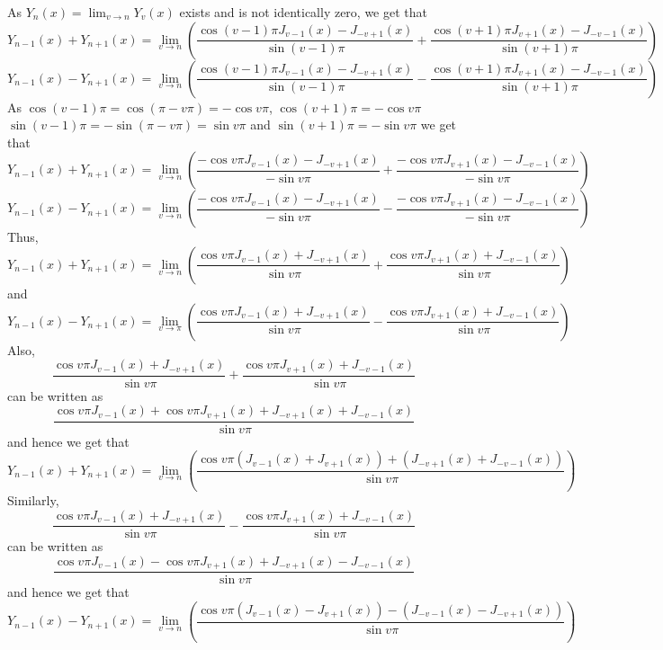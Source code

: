 \documentclass{article}
\begin{document}
\begin{flushleft}
As $Y_{n}(x)=\lim _{v \rightarrow n} Y_{v}(x)$ exists and is not identically zero, we get that 
$$Y_{n-1}(x)+Y_{n+1}(x)=\lim _{v \rightarrow n}\left(\frac{\cos (v-1) \pi J_{v-1}(x)-J_{-v+1}(x)}{\sin (v-1) \pi}+\frac{\cos (v+1) \pi J_{v+1}(x)-J_{-v-1}(x)}{\sin (v+1) \pi}\right)$$
$$Y_{n-1}(x)-Y_{n+1}(x)=\lim _{v \rightarrow n}\left(\frac{\cos (v-1) \pi J_{v-1}(x)-J_{-v+1}(x)}{\sin (v-1) \pi}-\frac{\cos (v+1) \pi J_{v+1}(x)-J_{-v-1}(x)}{\sin (v+1) \pi}\right)$$
As $\cos (v-1) \pi=\cos (\pi-v \pi)=-\cos v \pi$, $\cos (v+1) \pi=-\cos v \pi$ $\sin (v-1) \pi=-\sin (\pi-v \pi)=\sin v \pi$ and $\sin (v+1) \pi=-\sin v \pi$
we get that
$$Y_{n-1}(x)+Y_{n+1}(x)=\lim _{v \rightarrow n}\left(\frac{-\cos v \pi J_{v-1}(x)-J_{-v+1}(x)}{-\sin v \pi}+\frac{-\cos v \pi J_{v+1}(x)-J_{-v-1}(x)}{-\sin v \pi}\right)$$
$$Y_{n-1}(x)-Y_{n+1}(x)=\lim _{v \rightarrow n}\left(\frac{-\cos v \pi J_{v-1}(x)-J_{-v+1}(x)}{-\sin v \pi}-\frac{-\cos v \pi J_{v+1}(x)-J_{-v-1}(x)}{-\sin v \pi}\right) $$
Thus, 
$$
Y_{n-1}(x)+Y_{n+1}(x)=\lim _{v \rightarrow n}\left(\frac{\cos v \pi J_{v-1}(x)+J_{-v+1}(x)}{\sin v \pi}+\frac{\cos v \pi J_{v+1}(x)+J_{-v-1}(x)}{\sin v \pi}\right)
$$
and
$$
Y_{n-1}(x)-Y_{n+1}(x)=\lim _{v \rightarrow \pi}\left(\frac{\cos v \pi J_{v-1}(x)+J_{-v+1}(x)}{\sin v \pi}-\frac{\cos v \pi J_{v+1}(x)+J_{-v-1}(x)}{\sin v \pi}\right)
$$
Also, 
$$
\frac{\cos v \pi J_{v-1}(x)+J_{-v+1}(x)}{\sin v \pi}+\frac{\cos v \pi J_{v+1}(x)+J_{-v-1}(x)}{\sin v \pi}
$$
can be written as
$$
\frac{\cos v \pi J_{v-1}(x)+\cos v \pi J_{v+1}(x)+J_{-v+1}(x)+J_{-v-1}(x)}{\sin v \pi}
$$
and hence we get that
$$
Y_{n-1}(x)+Y_{n+1}(x)=\lim _{v \rightarrow n}\left(\frac{\cos v \pi\left(J_{v-1}(x)+J_{v+1}(x)\right)+\left(J_{-v+1}(x)+J_{-v-1}(x)\right)}{\sin v \pi}\right)
$$
Similarly, 
$$
\frac{\cos v \pi J_{v-1}(x)+J_{-v+1}(x)}{\sin v \pi}-\frac{\cos v \pi J_{v+1}(x)+J_{-v-1}(x)}{\sin v \pi}
$$
can be written as
$$
\frac{\cos v \pi J_{v-1}(x)-\cos v \pi J_{v+1}(x)+J_{-v+1}(x)-J_{-v-1}(x)}{\sin v \pi}
$$
and hence we get that
$$
Y_{n-1}(x)-Y_{n+1}(x)=\lim _{v \rightarrow n}\left(\frac{\cos v \pi\left(J_{v-1}(x)-J_{v+1}(x)\right)-\left(J_{-v-1}(x)-J_{-v+1}(x)\right)}{\sin v \pi}\right)
$$


\end{flushleft}
\end{document}
